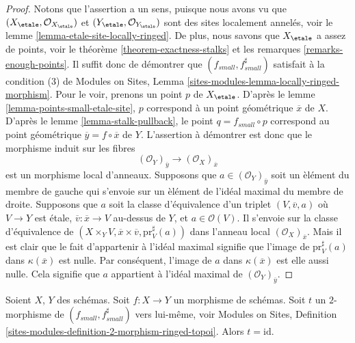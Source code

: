 \begin{proof}
Notons que l'assertion a un sens, puisque nous avons vu que
$(X_\etale, \mathcal{O}_{X_\etale})$ et
$(Y_\etale, \mathcal{O}_{Y_\etale})$
sont des sites localement annel\'es, voir le
lemme \ref{lemma-etale-site-locally-ringed}.
De plus, nous savons que $X_\etale$ a assez de points, voir le
th\'eor\`eme \ref{theorem-exactness-stalks}
et les
remarques \ref{remarks-enough-points}.
Il suffit donc de d\'emontrer que $(f_{small}, f_{small}^\sharp)$
satisfait \`a la condition (3) de
Modules on Sites,
Lemma \ref{sites-modules-lemma-locally-ringed-morphism}.
Pour le voir, prenons un point $p$ de $X_\etale$. D'apr\`es le
lemme \ref{lemma-points-small-etale-site},
$p$ correspond \`a un point g\'eom\'etrique $\overline{x}$ de $X$.
D'apr\`es le
lemme \ref{lemma-stalk-pullback},
le point $q = f_{small} \circ p$ correspond au
point g\'eom\'etrique $\overline{y} = f \circ \overline{x}$ de $Y$.
L'assertion \`a d\'emontrer est donc que le morphisme induit
sur les fibres
$$
(\mathcal{O}_Y)_{\overline{y}} \longrightarrow (\mathcal{O}_X)_{\overline{x}}
$$
est un morphisme local d'anneaux. Supposons que $a \in (\mathcal{O}_Y)_{\overline{y}}$
soit un \`el\'ement du membre de gauche qui s'envoie sur un \`el\'ement de l'id\'eal
maximal du membre de droite. Supposons que $a$ soit la classe d'\'equivalence
d'un triplet $(V, \overline{v}, a)$ o\`u $V \to Y$ est \'etale,
$\overline{v} : \overline{x} \to V$ au-dessus de $Y$, et $a \in \mathcal{O}(V)$.
Il s'envoie sur la classe d'\'equivalence de
$(X \times_Y V, \overline{x} \times \overline{v}, \text{pr}_V^\sharp(a))$
dans l'anneau local $(\mathcal{O}_X)_{\overline{x}}$. Mais il est clair que
le fait d'appartenir \`a l'id\'eal maximal signifie que l'image de $\text{pr}_V^\sharp(a)$
dans $\kappa(\overline{x})$ est nulle. Par cons\'equent, l'image de
$a$ dans $\kappa(\overline{x})$ est elle aussi nulle. Cela signifie que $a$ appartient \`a
l'id\'eal maximal de $(\mathcal{O}_Y)_{\overline{y}}$.
\end{proof}

\begin{lemma}
\label{lemma-2-morphism}
Soient $X$, $Y$ des sch\'emas. Soit $f : X \to Y$ un morphisme de sch\'emas.
Soit $t$ un $2$-morphisme de $(f_{small}, f_{small}^\sharp)$ vers lui-m\^eme, voir
Modules on Sites,
Definition \ref{sites-modules-definition-2-morphism-ringed-topoi}.
Alors $t = \text{id}$.
\end{lemma}

